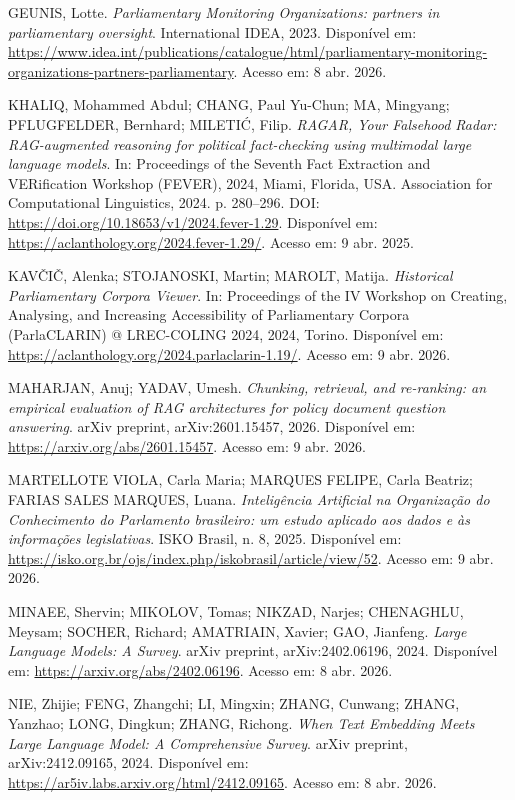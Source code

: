 GEUNIS, Lotte. \textit{Parliamentary Monitoring Organizations: partners in parliamentary oversight}. International IDEA, 2023. Disponível em: \url{https://www.idea.int/publications/catalogue/html/parliamentary-monitoring-organizations-partners-parliamentary}. Acesso em: 8 abr. 2026.

KHALIQ, Mohammed Abdul; CHANG, Paul Yu-Chun; MA, Mingyang; PFLUGFELDER, Bernhard; MILETIĆ, Filip. \textit{RAGAR, Your Falsehood Radar: RAG-augmented reasoning for political fact-checking using multimodal large language models}. In: Proceedings of the Seventh Fact Extraction and VERification Workshop (FEVER), 2024, Miami, Florida, USA. Association for Computational Linguistics, 2024. p. 280--296. DOI: \url{https://doi.org/10.18653/v1/2024.fever-1.29}. Disponível em: \url{https://aclanthology.org/2024.fever-1.29/}. Acesso em: 9 abr. 2025.

KAVČIČ, Alenka; STOJANOSKI, Martin; MAROLT, Matija. \textit{Historical Parliamentary Corpora Viewer}. In: Proceedings of the IV Workshop on Creating, Analysing, and Increasing Accessibility of Parliamentary Corpora (ParlaCLARIN) @ LREC-COLING 2024, 2024, Torino. Disponível em: \url{https://aclanthology.org/2024.parlaclarin-1.19/}. Acesso em: 9 abr. 2026.

MAHARJAN, Anuj; YADAV, Umesh. \textit{Chunking, retrieval, and re-ranking: an empirical evaluation of RAG architectures for policy document question answering}. arXiv preprint, arXiv:2601.15457, 2026. Disponível em: \url{https://arxiv.org/abs/2601.15457}. Acesso em: 9 abr. 2026.

MARTELLOTE VIOLA, Carla Maria; MARQUES FELIPE, Carla Beatriz; FARIAS SALES MARQUES, Luana. \textit{Inteligência Artificial na Organização do Conhecimento do Parlamento brasileiro: um estudo aplicado aos dados e às informações legislativas}. ISKO Brasil, n. 8, 2025. Disponível em: \url{https://isko.org.br/ojs/index.php/iskobrasil/article/view/52}. Acesso em: 9 abr. 2026.

MINAEE, Shervin; MIKOLOV, Tomas; NIKZAD, Narjes; CHENAGHLU, Meysam; SOCHER, Richard; AMATRIAIN, Xavier; GAO, Jianfeng. \textit{Large Language Models: A Survey}. arXiv preprint, arXiv:2402.06196, 2024. Disponível em: \url{https://arxiv.org/abs/2402.06196}. Acesso em: 8 abr. 2026.

NIE, Zhijie; FENG, Zhangchi; LI, Mingxin; ZHANG, Cunwang; ZHANG, Yanzhao; LONG, Dingkun; ZHANG, Richong. \textit{When Text Embedding Meets Large Language Model: A Comprehensive Survey}. arXiv preprint, arXiv:2412.09165, 2024. Disponível em: \url{https://ar5iv.labs.arxiv.org/html/2412.09165}. Acesso em: 8 abr. 2026.

